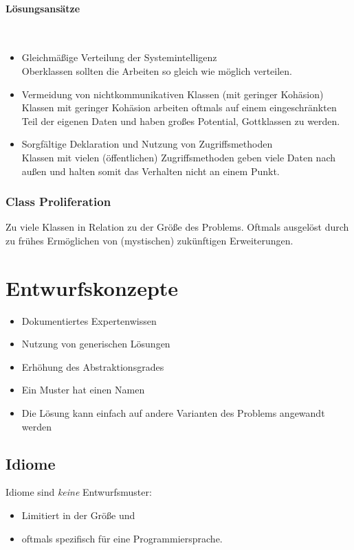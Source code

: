 \documentclass[ngerman]{tuda_summary}
\begin{document}
\paragraph{Lösungsansätze}\mbox{}\\
\begin{itemize}
    \item Gleichmäßige Verteilung der Systemintelligenz \\
          Oberklassen sollten die Arbeiten so gleich wie möglich verteilen.
    \item Vermeidung von nichtkommunikativen Klassen (mit geringer Kohäsion) \\
          Klassen mit geringer Kohäsion arbeiten oftmals auf einem eingeschränkten Teil der eigenen Daten und haben großes Potential, Gottklassen zu werden.
    \item Sorgfältige Deklaration und Nutzung von Zugriffsmethoden \\
          Klassen mit vielen (öffentlichen) Zugriffsmethoden geben viele Daten nach außen und halten somit das Verhalten nicht an einem Punkt.
\end{itemize}

\subsubsection{Class Proliferation}
Zu viele Klassen in Relation zu der Größe des Problems. Oftmals ausgelöst durch zu frühes Ermöglichen von (mystischen) zukünftigen Erweiterungen.
\clearpage
\section{Entwurfskonzepte}
\begin{itemize}
    \item Dokumentiertes Expertenwissen
    \item Nutzung von generischen Lösungen
    \item Erhöhung des Abstraktionsgrades
    \item Ein Muster hat einen Namen
    \item Die Lösung kann einfach auf andere Varianten des Problems angewandt werden
\end{itemize}

\subsection{Idiome}
Idiome sind \textit{keine} Entwurfsmuster:
\begin{itemize}
    \item Limitiert in der Größe und
    \item oftmals spezifisch für eine Programmiersprache.
\end{itemize}
\end{document}
